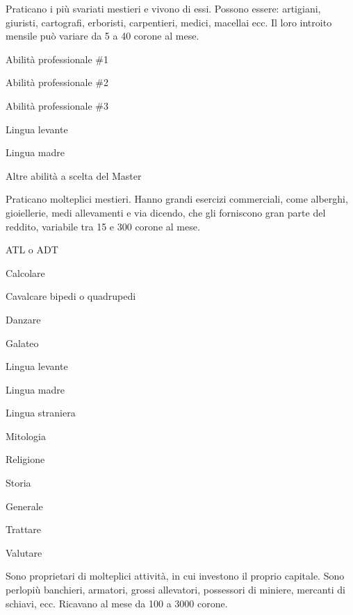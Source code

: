 
Praticano i pi\`u svariati mestieri e vivono di essi. Possono
essere: artigiani, giuristi, cartografi, erboristi, carpentieri,
medici, macellai ecc. Il loro introito mensile pu\`o variare da 5
a 40 corone al mese.

\begin{abilist}
\item Abilit\`a professionale \#1
\item Abilit\`a professionale \#2
\item Abilit\`a professionale \#3
\item Lingua levante
\item Lingua madre
\item Altre abilit\`a a scelta del Master
\end{abilist}


Praticano molteplici mestieri. Hanno grandi esercizi commerciali, come
alberghi, gioiellerie, medi allevamenti e via dicendo, che gli
forniscono gran parte del reddito, variabile tra 15 e 300 corone al
mese.

\begin{abilist}
\item ATL o ADT
\item Calcolare
\item Cavalcare bipedi o quadrupedi
\item Danzare
\item Galateo
\item Lingua levante
\item Lingua madre
\item Lingua straniera
\item Mitologia
\item Religione 
\item Storia
\item Generale
\item Trattare
\item Valutare
\end{abilist}


Sono proprietari di molteplici attivit\`a, in cui investono il proprio
capitale. Sono perlopi\`u banchieri, armatori, grossi allevatori,
possessori di miniere, mercanti di schiavi, ecc. Ricavano al mese da
100 a 3000 corone.


